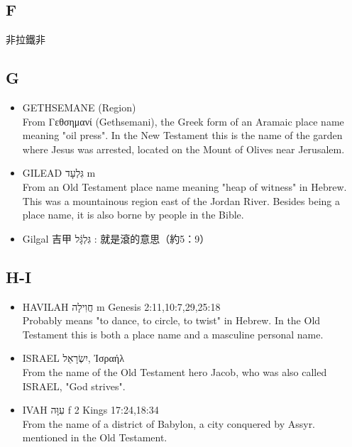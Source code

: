 \subsection{F}
非拉鐵非

\subsection{G}
\begin{itemize} 
\itemsep-.25em 
\item GETHSEMANE (Region) \\
From Γεθσημανί (Gethsemani), the Greek form of an Aramaic place name meaning "oil press". In the New Testament this is the name of the garden where Jesus was arrested, located on the Mount of Olives near Jerusalem.
\item GILEAD גִּלְעָד m \\
From an Old Testament place name meaning "heap of witness" in Hebrew. This was a mountainous region east of the Jordan River. Besides being a place name, it is also borne by people in the Bible.
\item Gilgal 吉甲 גִּלְגָּ֔ל : 就是滾的意思（約5：9）\\
\end{itemize} 

\subsection{H-I}
\begin{itemize} 
\itemsep-.25em 
\item HAVILAH חֲוִילָה m Genesis 2:11,10:7,29,25:18\\
Probably means "to dance, to circle, to twist" in Hebrew. In the Old Testament this is both a place name and a masculine personal name.
\item ISRAEL יִשְׂרָאֵל, Ἰσραήλ \\
From the name of the Old Testament hero Jacob, who was also called ISRAEL, "God strives". 
\item IVAH עִוָּה f 2 Kings 17:24,18:34\\
From the name of a district of Babylon, a city conquered by Assyr. mentioned in the Old Testament.
\end{itemize} 

